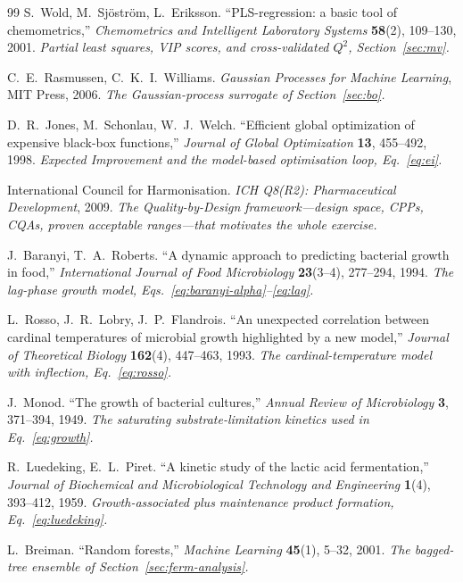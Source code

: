 \begin{thebibliography}{99}
S.~Wold, M.~Sj\"ostr\"om, L.~Eriksson.
``PLS-regression: a basic tool of chemometrics,'' \textit{Chemometrics and
Intelligent Laboratory Systems} \textbf{58}(2), 109--130, 2001.
\emph{Partial least squares, VIP scores, and cross-validated $Q^2$,
Section~\ref{sec:mv}.}

C.~E.~Rasmussen, C.~K.~I.~Williams.
\textit{Gaussian Processes for Machine Learning}, MIT Press, 2006.
\emph{The Gaussian-process surrogate of Section~\ref{sec:bo}.}

D.~R.~Jones, M.~Schonlau, W.~J.~Welch.
``Efficient global optimization of expensive black-box functions,''
\textit{Journal of Global Optimization} \textbf{13}, 455--492, 1998.
\emph{Expected Improvement and the model-based optimisation loop,
Eq.~\eqref{eq:ei}.}

International Council for Harmonisation.
\textit{ICH Q8(R2): Pharmaceutical Development}, 2009.
\emph{The Quality-by-Design framework---design space, CPPs, CQAs, proven
acceptable ranges---that motivates the whole exercise.}

J.~Baranyi, T.~A.~Roberts.
``A dynamic approach to predicting bacterial growth in food,''
\textit{International Journal of Food Microbiology} \textbf{23}(3--4), 277--294,
1994.
\emph{The lag-phase growth model, Eqs.~\eqref{eq:baranyi-alpha}--\eqref{eq:lag}.}

L.~Rosso, J.~R.~Lobry, J.~P.~Flandrois.
``An unexpected correlation between cardinal temperatures of microbial growth
highlighted by a new model,'' \textit{Journal of Theoretical Biology}
\textbf{162}(4), 447--463, 1993.
\emph{The cardinal-temperature model with inflection, Eq.~\eqref{eq:rosso}.}

J.~Monod.
``The growth of bacterial cultures,'' \textit{Annual Review of Microbiology}
\textbf{3}, 371--394, 1949.
\emph{The saturating substrate-limitation kinetics used in Eq.~\eqref{eq:growth}.}

R.~Luedeking, E.~L.~Piret.
``A kinetic study of the lactic acid fermentation,'' \textit{Journal of
Biochemical and Microbiological Technology and Engineering} \textbf{1}(4),
393--412, 1959.
\emph{Growth-associated plus maintenance product formation, Eq.~\eqref{eq:luedeking}.}

L.~Breiman.
``Random forests,'' \textit{Machine Learning} \textbf{45}(1), 5--32, 2001.
\emph{The bagged-tree ensemble of Section~\ref{sec:ferm-analysis}.}


\end{thebibliography}
